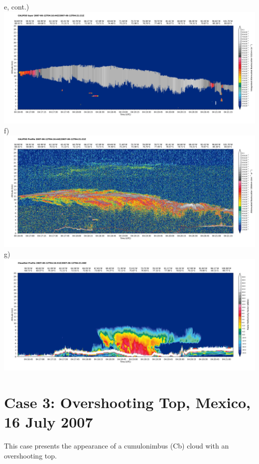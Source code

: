 \noindent\textsf{e, cont.)}\\[2mm]
\includegraphics[width=150mm,clip,trim=10mm 10mm 4mm 4mm]{images/antarctica/1calipso532-layer.pdf}\\[-3mm]
\noindent\textsf{\small f)}\\
\includegraphics[width=150mm,clip,trim=10mm 10mm 4mm 4mm]{images/antarctica/1calipso1064.pdf}\\[-3mm]
\noindent\textsf{\small g)}\\
\includegraphics[width=150mm,clip,trim=10mm 10mm 4mm 4mm]{images/antarctica/1cloudsat-reflec.pdf}

\clearpage
\section*{Case 3: Overshooting Top, Mexico, 16 July 2007}
This case presents the appearance of a cumulonimbus (Cb) cloud with an overshooting top.
\vspace{3mm}

